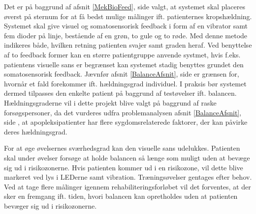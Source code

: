 Det er på baggrund af afsnit \ref{MekBioFeed}, side \pageref{MekBioFeed} valgt, at systemet skal placeres øverst på sternum for at få bedst mulige målinger ift. patienternes kropshældning. Systemet skal give visuel og somatosensorisk feedback i form af en vibrator samt fem dioder på linje, bestående af en grøn, to gule og to røde. Med denne metode indikeres både, hvilken retning patienten svajer samt graden heraf. Ved benyttelse af to feedback former kan en større patientgruppe anvende systmet, hvis f.eks. patientens visuelle sans er begrænset kan systemet stadig benyttes grundet den somatosensorisk feedback. Jævnfør afsnit \ref{BalanceAfsnit}, side \pageref{BalanceAfsnit} er grænsen for, hvornår et fald forekommer ift. hældningsgrad individuel. I praksis bør systemet dermed tilpasses den enkelte patient på baggrund af testøvelser ift. balancen. Hældningsgraderne vil i dette projekt blive valgt på baggrund af raske forsøgspersoner, da det vurderes udfra problemanalysen afsnit \ref{BalanceAfsnit}, side \pageref{BalanceAfsnit}, at apopleksipatienter har flere sygdomsrelaterede faktorer, der kan påvirke deres hældningsgrad. 


For at øge øvelsernes sværhedsgrad kan den visuelle sans udelukkes. Patienten skal under øvelser forsøge at holde balancen så længe som muligt uden at bevæge sig ud i risikozonerne. Hvis patienten kommer ud i en risikozone, vil dette blive markeret ved lys i LEDerne samt vibration. Træningsøvelser gentages efter behov. Ved at tage flere målinger igennem rehabiliteringsforløbet vil det forventes, at der sker en fremgang ift. tiden, hvori balancen kan opretholdes uden at patienten bevæger sig ud i risikozonerne. 

